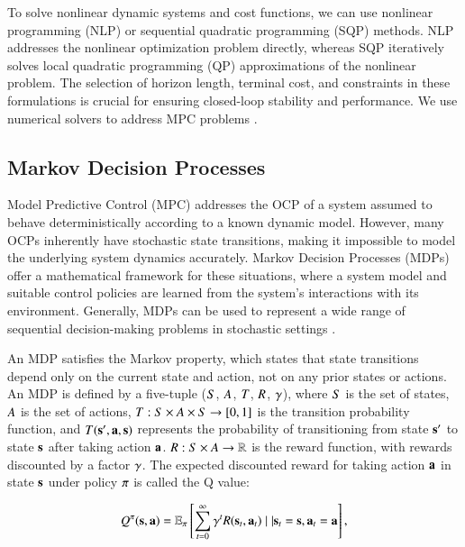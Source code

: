 To solve nonlinear dynamic systems and cost functions, we can use nonlinear programming (NLP) or sequential quadratic programming (SQP) methods. NLP addresses the nonlinear optimization problem directly, whereas SQP iteratively solves local quadratic programming (QP) approximations of the nonlinear problem. The selection of horizon length, terminal cost, and constraints in these formulations is crucial for ensuring closed-loop stability and performance. We use numerical solvers to address MPC problems \cite{forcespro}.

\subsection{Markov Decision Processes}
\label{sec:mdp}
Model Predictive Control (MPC) addresses the OCP of a system assumed to behave deterministically according to a known dynamic model. However, many OCPs inherently have stochastic state transitions, making it impossible to model the underlying system dynamics accurately. Markov Decision Processes (MDPs) offer a mathematical framework for these situations, where a system model and suitable control policies are learned from the system's interactions with its environment. Generally, MDPs can be used to represent a wide range of sequential decision-making problems in stochastic settings \citep{kaelbling1998planning}.

An MDP satisfies the Markov property, which states that state transitions depend only on the current state and action, not on any prior states or actions. An MDP is defined by a five-tuple ($S$, $A$, $T$, $R$, $\gamma$), where $S$ is the set of states, $A$ is the set of actions, $T: S \times A \times S \rightarrow [0,1]$ is the transition probability function, and $T (\mathbf{s}', \mathbf{a}, \mathbf{s})$ represents the probability of transitioning from state $\mathbf{s}'$ to state $\mathbf{s}$ after taking action $\mathbf{a}$. $R : S \times A \rightarrow \mathbb{R}$ is the reward function, with rewards discounted by a factor $\gamma$. The expected discounted reward for taking action $\mathbf{a}$ in state $\mathbf{s}$ under policy $\pi$ is called the Q value: 

\begin{equation}
\label{eq:q_value}
    Q^{\pi}(\mathbf{s},\mathbf{a}) = \mathbb{E}_\pi\left[\sum_{t=0}^{\infty}\gamma^t R(\mathbf{s}_t, \mathbf{a}_t) \mid | \mathbf{s}_t=\mathbf{s}, \mathbf{a}_t=\mathbf{a} \right ],
\end{equation}

